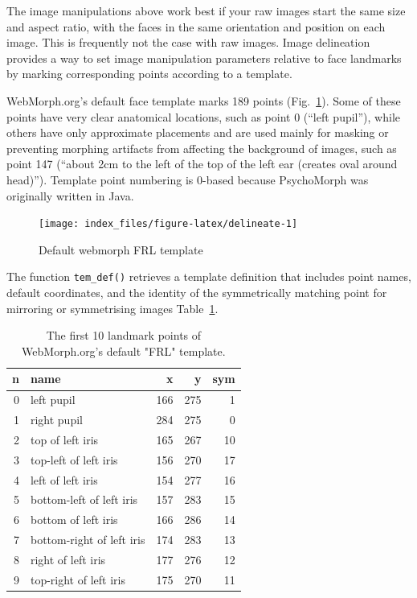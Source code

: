 \documentclass[
  doc,floatsintext]{apa6}
\begin{document}
The image manipulations above work best if your raw images start the same size and aspect ratio, with the faces in the same orientation and position on each image. This is frequently not the case with raw images. Image delineation provides a way to set image manipulation parameters relative to face landmarks by marking corresponding points according to a template.

WebMorph.org's default face template marks 189 points (Fig.~\ref{fig:delineate}). Some of these points have very clear anatomical locations, such as point 0 (``left pupil''), while others have only approximate placements and are used mainly for masking or preventing morphing artifacts from affecting the background of images, such as point 147 (``about 2cm to the left of the top of the left ear (creates oval around head)''). Template point numbering is 0-based because PsychoMorph was originally written in Java.

\begin{figure}
\texttt{[image: index\_files/figure-latex/delineate-1]} \caption{Default webmorph FRL template}\label{fig:delineate}
\end{figure}

The function \texttt{tem\_def()} retrieves a template definition that includes point names, default coordinates, and the identity of the symmetrically matching point for mirroring or symmetrising images Table~\ref{tab:tem-def}.

\begin{table}

\caption{\label{tab:tem-def}The first 10 landmark points of WebMorph.org's default "FRL" template.}
\centering
\begin{tabular}[t]{r|l|r|r|r}
\hline
n & name & x & y & sym\\
\hline
0 & left pupil & 166 & 275 & 1\\
\hline
1 & right pupil & 284 & 275 & 0\\
\hline
2 & top of left iris & 165 & 267 & 10\\
\hline
3 & top-left of left iris & 156 & 270 & 17\\
\hline
4 & left of left iris & 154 & 277 & 16\\
\hline
5 & bottom-left of left iris & 157 & 283 & 15\\
\hline
6 & bottom of left iris & 166 & 286 & 14\\
\hline
7 & bottom-right of left iris & 174 & 283 & 13\\
\hline
8 & right of left iris & 177 & 276 & 12\\
\hline
9 & top-right of left iris & 175 & 270 & 11\\
\hline
\end{tabular}
\end{table}
\end{document}
